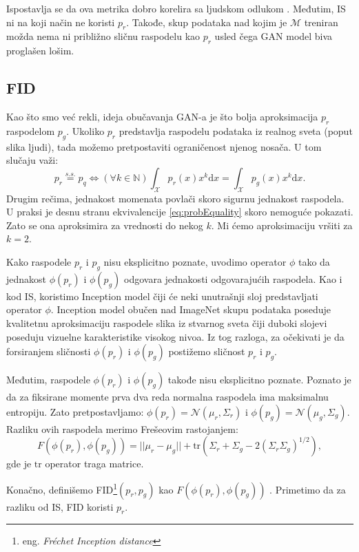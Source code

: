 \documentclass[12pt, a4paper]{article}
\begin{document}
Ispostavlja se da ova metrika dobro korelira sa ljudskom odlukom \cite{IS-2016}. Međutim, IS ni na koji način ne koristi $p_r$. Takođe, skup podataka nad kojim je $\mathcal{M}$ treniran možda nema ni približno sličnu raspodelu kao $p_r$ usled čega GAN model biva proglašen lošim.

\subsection{FID}
Kao što smo već rekli, ideja obučavanja GAN-a je što bolja aproksimacija $p_r$ raspodelom $p_g$. Ukoliko $p_r$ predstavlja raspodelu podataka iz realnog sveta (poput slika ljudi), tada možemo pretpostaviti ograničenost njenog nosača. U tom slučaju važi:
\begin{equation}
p_r \stackrel{s.s.}{=} p_q \iff (\forall k \in \mathbb{N}) \int_{\mathcal{X}} p_r(x) x^k \text{d}x = \int_{\mathcal{X}} p_g(x) x^k \text{d}x.
\label{eq:probEquality}
\end{equation}
Drugim rečima, jednakost momenata povlači skoro sigurnu jednakost raspodela. U praksi je desnu stranu ekvivalencije \ref{eq:probEquality} skoro nemoguće pokazati. Zato se ona aproksimira za vrednosti do nekog $k$. Mi ćemo aproksimaciju vršiti za $k=2$.

Kako raspodele $p_r$ i $p_g$ nisu eksplicitno poznate, uvodimo operator $\phi$ tako da jednakost $\phi(p_r)$ i $\phi(p_g)$ odgovara jednakosti odgovarajućih raspodela. Kao i kod IS, koristimo Inception model čiji će neki unutrašnji sloj predstavljati operator $\phi$. Inception model obučen nad ImageNet skupu podataka poseduje kvalitetnu aproksimaciju raspodele slika iz stvarnog sveta čiji duboki slojevi poseduju vizuelne karakteristike visokog nivoa. Iz tog razloga, za očekivati je da forsiranjem sličnosti $\phi(p_r)$ i $\phi(p_g)$ postižemo sličnost $p_r$ i $p_g$.

Međutim, raspodele $\phi(p_r)$ i $\phi(p_g)$ takođe nisu eksplicitno poznate. Poznato je da za fiksirane momente prva dva reda normalna raspodela ima maksimalnu entropiju. Zato pretpostavljamo: $\phi(p_r) = \mathcal{N}(\mu_r, \Sigma_r)$ i $\phi(p_g) = \mathcal{N}(\mu_g, \Sigma_g).$ Razliku ovih raspodela merimo Frešeovim rastojanjem:
\begin{equation}
F(\phi(p_r), \phi(p_g)) = ||\mu_r - \mu_g|| + \text{tr}\left(\Sigma_r + \Sigma_g - 2(\Sigma_r \Sigma_g)^{1/2}\right),
\end{equation}
gde je $\text{tr}$ operator traga matrice.

Konačno, definišemo FID\footnote{eng. \textit{Fréchet Inception distance}}$(p_r, p_g)$ kao $F(\phi(p_r), \phi(p_g))$ \cite{FID-2017}. Primetimo da za razliku od IS, FID koristi $p_r$.
\end{document}

